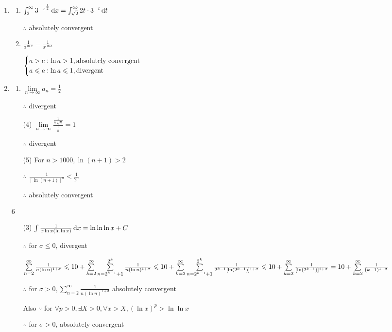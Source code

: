 \begin{enumerate}[1]
   \item
   \begin{enumerate}[(1)]
     \item
     $\int_{2}^{\infty} 3^{-x^{\frac{1}{2}}} \dif x=\int_{\sqrt{2}}^{\infty} 2t\cdot 3^{-t} \dif t$
     \par $\therefore$ absolutely convergent

     \item
     $\frac{1}{a^{\ln x}}=\frac{1}{x^{\ln a}}$
     \par $\begin{cases} a>\mathrm{e}:\ln a>1,\text{absolutely convergent}\\a\leqslant \mathrm{e}:\ln a\leqslant 1,\text{divergent} \end{cases}$
   \end{enumerate}

   \item
   \begin{enumerate}[(1)]
     \item
     $\lim\limits_{n\rightarrow{\infty}}a_n=\frac{1}{2}$
     \par $\therefore$ divergent

     \item[(4)]
     $\lim\limits_{n\rightarrow{\infty}}\frac{\frac{1}{n \sqrt[n]{n}}}{\frac{1}{n}}=1$
     \par $\therefore$ divergent

     \item[(5)]
     For $n>1000,\ln (n+1)>2$
     \par $\therefore$ $\frac{1}{[\ln (n+1)]^n}<\frac{1}{2^n}$
     \par $\therefore$ absolutely convergent
   \end{enumerate}

   \item[6]
   \begin{enumerate}[(1)]
     \item[(3)]
     $\int \frac{1}{x\ln x(\ln \ln x)} \dif x=\ln \ln \ln x+C$
     \par $\therefore$ for $\sigma \leqslant 0$, divergent
     \par $\sum\limits_{n=2}^{\infty}\frac{1}{n(\ln n)^{1+\sigma}}\leqslant10+\sum\limits_{k=2}^{\infty}\sum\limits_{n=2^{k-1}+1}^{2^k}\frac{1}{n(\ln n)^{1+\sigma}}\\
     \leqslant 10+\sum\limits_{k=2}^{\infty}\sum\limits_{n=2^{k-1}+1}^{2^k}\frac{1}{2^{k-1}[\ln (2^{k-1})]^{1+\sigma}}\\
     \leqslant 10+\sum\limits_{k=2}^{\infty}\frac{1}{[\ln (2^{k-1})]^{1+\sigma}}\\
     =10+\sum\limits_{k=2}^{\infty}\frac{1}{(k-1)^{1+\sigma}}$
     \par $\therefore$ for $\sigma>0, \sum\limits_{n=2}^{\infty}\frac{1}{n(\ln n)^{1+\sigma}}$ absolutely convergent
     \par Also $\because$ for $\forall p>0, \exists X>0, \forall x>X, (\ln x)^p>\ln \ln x$
     \par $\therefore$ for $\sigma>0$, absolutely convergent


\end{enumerate}
\end{enumerate}
